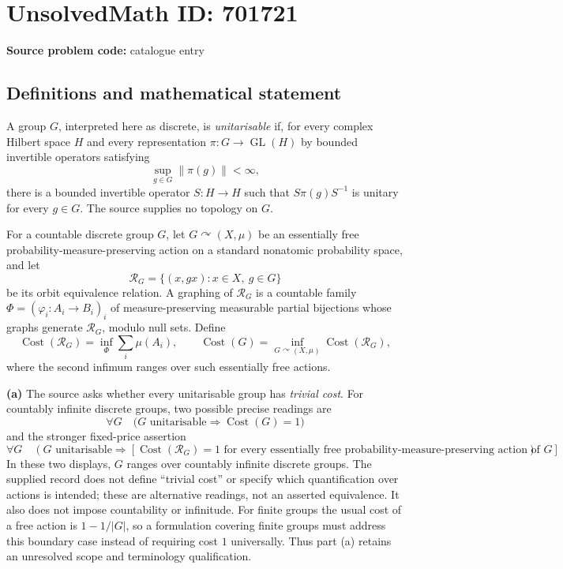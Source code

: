 \documentclass[11pt]{article}
\begin{document}
\section*{UnsolvedMath ID: 701721}
\textbf{Source problem code:} catalogue entry
\subsection{Definitions and mathematical statement}
A group \(G\), interpreted here as discrete, is \emph{unitarisable} if, for every complex Hilbert space \(H\) and every representation \(\pi:G\to\operatorname{GL}(H)\) by bounded invertible operators satisfying
\[
\sup_{g\in G}\|\pi(g)\|<\infty,
\]
there is a bounded invertible operator \(S:H\to H\) such that \(S\pi(g)S^{-1}\) is unitary for every \(g\in G\). The source supplies no topology on \(G\).

For a countable discrete group \(G\), let \(G\curvearrowright(X,\mu)\) be an essentially free probability-measure-preserving action on a standard nonatomic probability space, and let
\[
\mathcal R_G=\{(x,gx):x\in X,\ g\in G\}
\]
be its orbit equivalence relation. A graphing of \(\mathcal R_G\) is a countable family \(\Phi=(\varphi_i:A_i\to B_i)_i\) of measure-preserving measurable partial bijections whose graphs generate \(\mathcal R_G\), modulo null sets. Define
\[
\operatorname{Cost}(\mathcal R_G)
=\inf_{\Phi}\sum_i\mu(A_i),
\qquad
\operatorname{Cost}(G)
=\inf_{G\curvearrowright(X,\mu)}\operatorname{Cost}(\mathcal R_G),
\]
where the second infimum ranges over such essentially free actions.

\textbf{(a)} The source asks whether every unitarisable group has \emph{trivial cost}. For countably infinite discrete groups, two possible precise readings are
\[
\forall G\quad
\bigl(G\text{ unitarisable}\Longrightarrow\operatorname{Cost}(G)=1\bigr)
\]
and the stronger fixed-price assertion
\[
\forall G\quad
\left(G\text{ unitarisable}\Longrightarrow
\left[\operatorname{Cost}(\mathcal R_G)=1
\text{ for every essentially free probability-measure-preserving action of }G\right]\right).
\]
In these two displays, \(G\) ranges over countably infinite discrete groups. The supplied record does not define ``trivial cost'' or specify which quantification over actions is intended; these are alternative readings, not an asserted equivalence. It also does not impose countability or infinitude. For finite groups the usual cost of a free action is \(1-1/|G|\), so a formulation covering finite groups must address this boundary case instead of requiring cost \(1\) universally. Thus part (a) retains an unresolved scope and terminology qualification.
\end{document}
